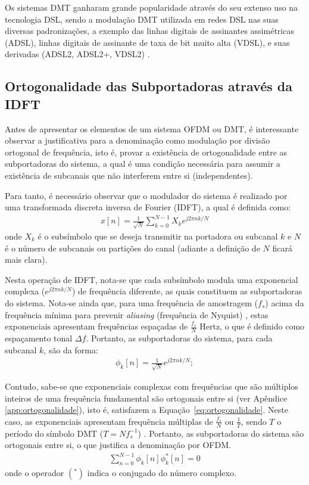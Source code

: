 Os sistemas DMT ganharam grande popularidade através do seu extenso uso na tecnologia DSL, sendo a modulação DMT utilizada em redes DSL nas suas diversas padronizações, a exemplo das linhas digitais de assinantes assimétricas (ADSL), linhas digitais de assinante de taxa de bit muito alta (VDSL), e suas derivadas (ADSL2, ADSL2+, VDSL2) \cite{cioffibook2003}.

\subsection{Ortogonalidade das Subportadoras através da IDFT}
\label{sec:ortogonalidade_devido_idft}

Antes de apresentar os elementos de um sistema OFDM ou DMT, é interessante observar a justificativa para a denominação como modulação por divisão ortogonal de frequência, isto é, provar a existência de ortogonalidade entre as subportadoras do sistema, a qual é uma condição necessária para assumir a existência de subcanais que não interferem entre si (independentes).

Para tanto, é necessário observar que o modulador do sistema é realizado por uma transformada discreta inversa de Fourier (IDFT), a qual é definida como:
\begin{align}
x[n] = \frac{1}{\sqrt{N}} \sum \limits_{k=0}^{N-1} X_k e^{j2\pi n k/N}
\label{eq:idft}
\end{align}
onde $X_k$ é o subsímbolo que se deseja transmitir na portadora ou subcanal $k$  e $N$ é o número de subcanais ou partições do canal (adiante a definição de $N$ ficará mais clara).

Nesta operação de IDFT, nota-se que cada subsímbolo modula uma exponencial complexa ($e^{j2\pi n k/N}$) de frequência diferente, as quais constituem as subportadoras do sistema. Nota-se ainda que, para uma frequência de amostragem ($f_s$) acima da frequência mínima para prevenir \textsl{aliasing} (frequência de Nyquist) \cite{lathi2009}, estas exponenciais apresentam frequências espaçadas de $\frac{f_s}{N}$ Hertz, o que é definido como espaçamento tonal $\Delta f$. Portanto, as subportadoras do sistema, para cada subcanal $k$, são da forma:
\begin{align}
\phi_k[n] = \frac{1}{\sqrt{N}}e^{j2\pi n k/N};
\label{eq:portadoras}
\end{align}

Contudo, sabe-se que exponenciais complexas com frequências que são múltiplos inteiros de uma frequência fundamental são ortogonais entre si (ver Apêndice \ref{app:ortogonalidade}), isto é, satisfazem a Equação~\ref{eq:ortogonalidade}. Neste caso, as exponenciais apresentam frequência múltiplas de $\frac{f_s}{N}$ ou $\frac{1}{T}$, sendo $T$ o período do símbolo DMT ($T= Nf_s^{-1}$) . Portanto, as subportadoras do sistema são ortogonais entre si, o que justifica a denominação por OFDM.
\begin{align}
\sum \limits_{n=0}^{N-1} \phi_k[n] \phi_k^{*}[n] = 0
\label{eq:ortogonalidade}
\end{align}
onde o operador $(^{*})$ indica o conjugado do número complexo.

